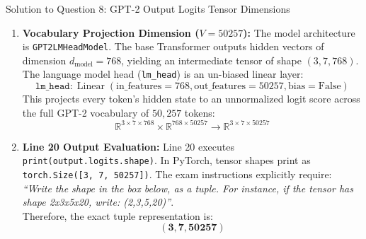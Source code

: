 \documentclass[11pt,a4paper]{article}
\begin{document}
\begin{solutionbox}{Solution to Question 8: GPT-2 Output Logits Tensor Dimensions}
\begin{enumerate}[leftmargin=1.5em]
    \item \textbf{Vocabulary Projection Dimension ($V = 50257$):}
    The model architecture is \texttt{GPT2LMHeadModel}. The base Transformer outputs hidden vectors of dimension $d_{\text{model}} = 768$, yielding an intermediate tensor of shape $(3, 7, 768)$.
    The language model head (\texttt{lm\_head}) is an un-biased linear layer:
    \begin{equation*}
        \texttt{lm\_head}: \operatorname{Linear}(\text{in\_features}=768, \text{out\_features}=50257, \text{bias}=\text{False})
    \end{equation*}
    This projects every token's hidden state to an unnormalized logit score across the full GPT-2 vocabulary of $50{,}257$ tokens:
    \begin{equation*}
        \mathbb{R}^{3 \times 7 \times 768} \times \mathbb{R}^{768 \times 50257} \longrightarrow \mathbb{R}^{3 \times 7 \times 50257}
    \end{equation*}

    \item \textbf{Line 20 Output Evaluation:}
    Line 20 executes \texttt{print(output.logits.shape)}. In PyTorch, tensor shapes print as \texttt{torch.Size([3, 7, 50257])}. The exam instructions explicitly require: \textit{``Write the shape in the box below, as a tuple. For instance, if the tensor has shape 2x3x5x20, write: (2,3,5,20)''}.\\
    Therefore, the exact tuple representation is:
    \begin{equation*}
        \mathbf{(3, 7, 50257)}
    \end{equation*}
\end{enumerate}
\end{solutionbox}

\newpage
\end{document}
